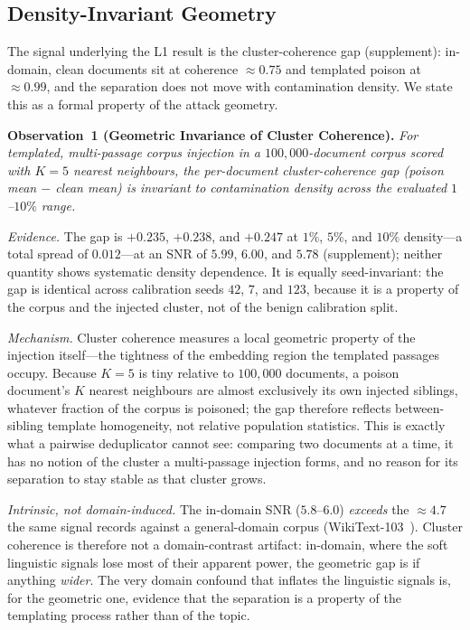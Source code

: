 \documentclass[10pt,journal,compsoc]{IEEEtran}
\begin{document}
\subsection{Density-Invariant Geometry}
\label{subsec:geom}
The signal underlying the L1 result is the cluster-coherence gap
(supplement): in-domain, clean documents sit at coherence $\approx 0.75$
and templated poison at $\approx 0.99$, and the separation does not move with
contamination density. We state this as a formal property of the attack geometry.

\smallskip
\noindent\textbf{Observation~1 (Geometric Invariance of Cluster Coherence).}
\emph{For templated, multi-passage corpus injection in a $100{,}000$-document
corpus scored with $K=5$ nearest neighbours, the per-document cluster-coherence gap
(poison mean $-$ clean mean) is invariant to contamination density across the
evaluated $1$--$10\%$ range.}

\emph{Evidence.} The gap is $+0.235$, $+0.238$, and $+0.247$ at $1\%$, $5\%$, and
$10\%$ density---a total spread of $0.012$---at an SNR of $5.99$, $6.00$, and $5.78$
(supplement); neither quantity shows systematic density dependence. It is
equally seed-invariant: the gap is identical across calibration seeds $42$, $7$, and
$123$, because it is a property of the corpus and the injected cluster, not of the
benign calibration split.

\emph{Mechanism.} Cluster coherence measures a local geometric property of the
injection itself---the tightness of the embedding region the templated passages
occupy. Because $K=5$ is tiny relative to $100{,}000$ documents, a poison document's
$K$ nearest neighbours are almost exclusively its own injected siblings, whatever
fraction of the corpus is poisoned; the gap therefore reflects between-sibling
template homogeneity, not relative population statistics. This is exactly what a
pairwise deduplicator cannot see: comparing two documents at a time, it has no
notion of the cluster a multi-passage injection forms, and no reason for its
separation to stay stable as that cluster grows.

\emph{Intrinsic, not domain-induced.} The in-domain SNR ($5.8$--$6.0$) \emph{exceeds}
the $\approx\!4.7$ the same signal records against a general-domain corpus
(WikiText-103~\cite{wikitext}). Cluster coherence is therefore not a domain-contrast
artifact: in-domain, where the soft linguistic signals lose most of their apparent
power, the geometric gap is if anything \emph{wider}. The
very domain confound that inflates the linguistic signals is, for the geometric one,
evidence that the separation is a property of the templating process rather than of
the topic.
\end{document}
